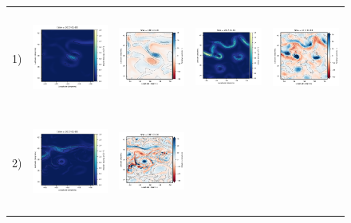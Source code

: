 \begin{figure}[h!]
\begin{center}
\begin{tabular}{ccccc}
\hspace{-10mm}  1)&
\includegraphics[trim={0 13mm 22mm 5mm},clip, width=3.60cm,height=3.2cm]{figures/plots/orca025_train_ke.png} &
 \includegraphics[trim={13mm 13mm 22mm 5mm},clip, width=3.2cm,height=3.2cm]{figures/plots/orca025_train_vort_r.png} &
 \includegraphics[trim={13mm 13mm 22mm 5mm},clip, width=3.2cm,height=3.2cm]{figures/plots/orca025_rec_ke.png} &
 \includegraphics[trim={13mm 13mm 22mm 5mm},clip,width=3.2cm,height=3.2cm]{figures/plots/orca025_rec_vort_r.png} \\
\hspace{-10mm} 2) &
 \includegraphics[trim={0 13mm 22mm 5mm},clip, width=3.60cm,height=3.2cm]{figures/plots/glorys12-f_train_ke.png} &
 \includegraphics[trim={13mm 13mm 22mm 5mm},clip, width=3.2cm,height=3.2cm]{figures/plots/glorys12-f_train_vort_r.png} &

\end{tabular}
\end{center}
\end{figure}
